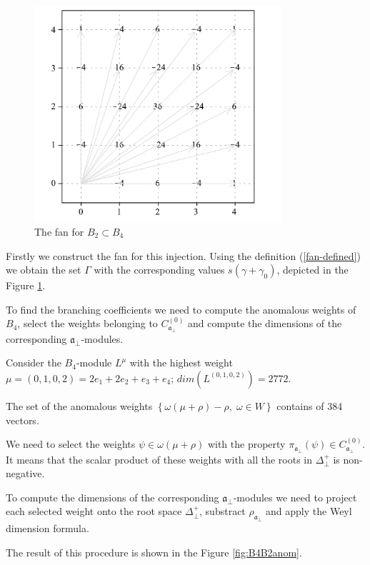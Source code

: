 \documentclass[a4paper,12pt]{article}
\theoremstyle{definition} \newtheorem{Def}{Definition}
\begin{document}
\begin{figure}[p]
  \centering
  \includegraphics[height=80mm]{B4_B2_fan.pdf}
  \caption{The fan for $B_2\subset B_4$}
  \label{fig:B4B2Fan}
\end{figure}

Firstly we construct the fan for this injection.
Using the definition (\ref{fan-defined}) we obtain the set $\Gamma$ with the corresponding values $s(\gamma+\gamma_0)$, depicted in the Figure \ref{fig:B4B2Fan}.

To find the branching coefficients we need to compute the anomalous weights of $B_4$, select the weights belonging to $C^{\left( 0 \right)}_{\mathfrak{a}_{\bot}}$ and compute the dimensions of the corresponding $\mathfrak{a}_{\bot}$-modules.

Consider the $B_4$-module $L^{\mu}$ with the highest weight $\mu=(0,1,0,2)=2
e_1 + 2 e_2 + e_3 + e_4$; $dim(L^{(0,1,0,2)})=2772$.

The set of the anomalous weights $\left\{ \omega(\mu+\rho)-\rho,\; \omega\in W\right\}$
contains of 384 vectors.

We need to select the weights $\psi \in \omega(\mu+\rho)$  with the property $\pi_{\mathfrak{a}_{\bot}} \left(  \psi \right) \in C^{\left( 0 \right)}_{\mathfrak{a}_{\bot}}$.
It means that the scalar product of these weights with all the roots in $\Delta^{+}_{\bot}$ is non-negative.

To compute the dimensions of the corresponding
$\mathfrak{a}_{\bot}$-modules we need to project each selected weight
onto the root space $\Delta^{+}_{\bot}$, substract
$\rho_{\mathfrak{a}_{\bot}}$ and apply the Weyl dimension formula.

The result of this procedure is shown in the Figure \ref{fig:B4B2anom}.
\end{document}
